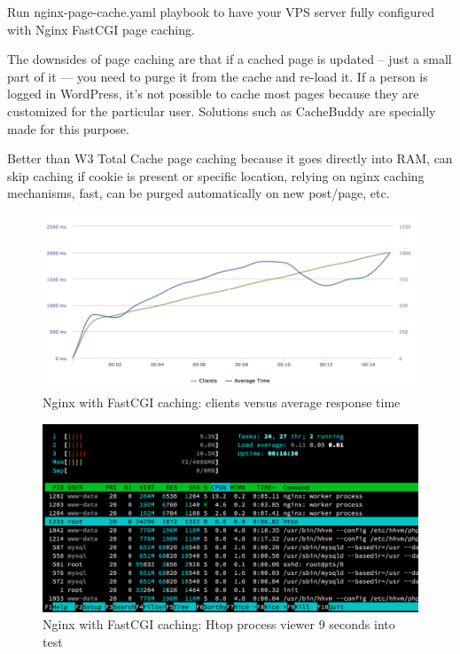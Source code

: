 Run nginx-page-cache.yaml playbook to have your VPS server fully configured with Nginx FastCGI page caching.

The downsides of page caching are that if a cached page is updated – just a small part of it — you need to purge it from the cache and re-load it. If a person is logged in WordPress, it's not possible to cache most pages because they are customized for the particular user. Solutions such as CacheBuddy are specially made for this purpose.

Better than W3 Total Cache page caching because it goes directly into RAM, can skip caching if cookie is present or specific location, relying on nginx caching mechanisms, fast, can be purged automatically on new post/page, etc.

\begin{figure}[H]
\begin{center}
\includegraphics[scale=0.5]{figures/Nginx_FastCGI_caching.png}
\caption{Nginx with FastCGI caching: clients versus average response time}
\label{fig:nginx_fastcgi_caching}
\end{center}
\end{figure}

\begin{figure}[H]
\begin{center}
\includegraphics[scale=0.5]{figures/Nginx_FastCGI_caching_9s.png}
\caption{Nginx with FastCGI caching: Htop process viewer 9 seconds into test}
\label{fig:nginx_fastcgi_caching}
\end{center}
\end{figure}

